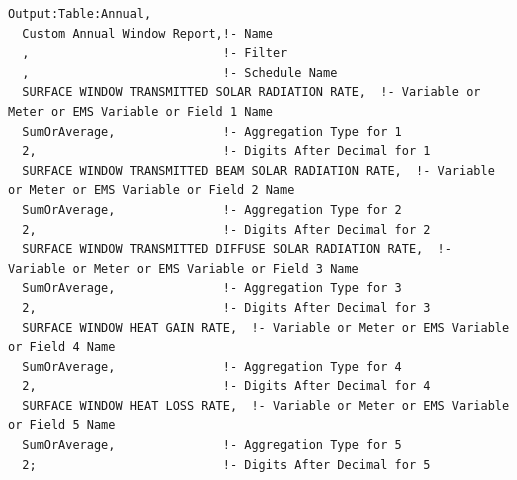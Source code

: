 \begin{lstlisting}
Output:Table:Annual,
  Custom Annual Window Report,!- Name
  ,                           !- Filter
  ,                           !- Schedule Name
  SURFACE WINDOW TRANSMITTED SOLAR RADIATION RATE,  !- Variable or Meter or EMS Variable or Field 1 Name
  SumOrAverage,               !- Aggregation Type for 1
  2,                          !- Digits After Decimal for 1
  SURFACE WINDOW TRANSMITTED BEAM SOLAR RADIATION RATE,  !- Variable or Meter or EMS Variable or Field 2 Name
  SumOrAverage,               !- Aggregation Type for 2
  2,                          !- Digits After Decimal for 2
  SURFACE WINDOW TRANSMITTED DIFFUSE SOLAR RADIATION RATE,  !- Variable or Meter or EMS Variable or Field 3 Name
  SumOrAverage,               !- Aggregation Type for 3
  2,                          !- Digits After Decimal for 3
  SURFACE WINDOW HEAT GAIN RATE,  !- Variable or Meter or EMS Variable or Field 4 Name
  SumOrAverage,               !- Aggregation Type for 4
  2,                          !- Digits After Decimal for 4
  SURFACE WINDOW HEAT LOSS RATE,  !- Variable or Meter or EMS Variable or Field 5 Name
  SumOrAverage,               !- Aggregation Type for 5
  2;                          !- Digits After Decimal for 5
\end{lstlisting}
